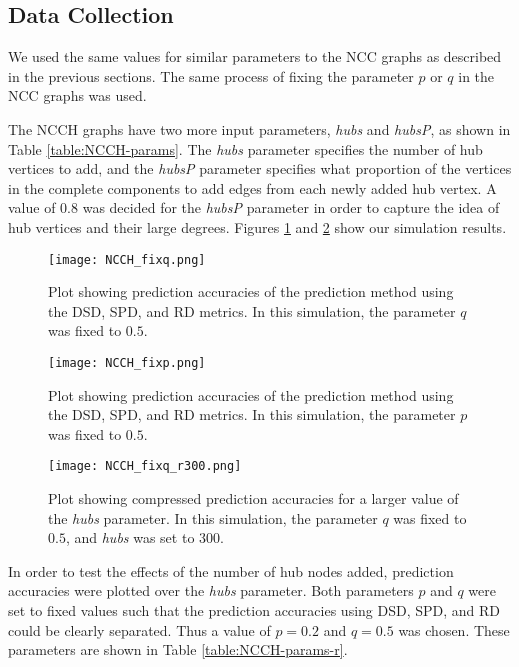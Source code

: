 \subsection{Data Collection}
We used the same values for similar parameters to the NCC graphs as described in the previous sections. The same process of fixing the parameter $p$ or $q$ in the NCC graphs was used.

The NCCH graphs have two more input parameters, \textit{hubs} and \textit{hubsP}, as
shown in Table \ref{table:NCCH-params}. The \textit{hubs} parameter specifies the
number of hub vertices to add, and the \textit{hubsP} parameter specifies what
proportion of the vertices in the complete components to add edges from each newly added hub vertex. A value of $0.8$ was decided for the \textit{hubsP} 
parameter in order to capture the idea of hub vertices and their large 
degrees. Figures \ref{fig:NCCH_fixq} and \ref{fig:NCCH_fixp} show our 
simulation results.

\begin{figure}[H]
\centering
\texttt{[image: NCCH\_fixq.png]}
\caption{Plot showing prediction accuracies of the prediction method using the DSD, SPD, and RD metrics. In this simulation, the parameter $q$ was fixed to $0.5$.}
\label{fig:NCCH_fixq}
\end{figure}

\begin{figure}[H]
\centering
\texttt{[image: NCCH\_fixp.png]}
\caption{Plot showing prediction accuracies of the prediction method using the DSD, SPD, and RD metrics. In this simulation, the parameter $p$ was fixed to $0.5$.}
\label{fig:NCCH_fixp}
\end{figure}

\begin{figure}[H]
\centering
\texttt{[image: NCCH\_fixq\_r300.png]}
\caption{Plot showing compressed prediction accuracies for a larger value of the \textit{hubs} parameter. In this simulation, the parameter $q$ was fixed to $0.5$, and \textit{hubs} was set to $300$.}
\label{fig:NCCH_fixq_r300}
\end{figure}

In order to test the effects of the number of hub nodes added, 
prediction accuracies were plotted over the \textit{hubs} parameter. Both 
parameters $p$ and $q$ were set to fixed values such that the prediction
accuracies using DSD, SPD, and RD could be clearly separated. Thus a value
of $p=0.2$ and $q=0.5$ was chosen. These parameters are shown in Table 
\ref{table:NCCH-params-r}.

